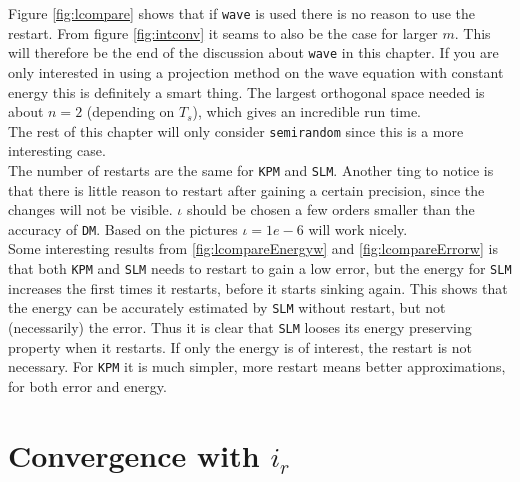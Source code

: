 Figure \ref{fig:lcompare} shows that if \texttt{wave} is used there is no reason to use the restart. From figure \ref{fig:intconv} it seams to also be the case for larger $m$. This will therefore be the end of the discussion about \texttt{wave} in this chapter. If you are only interested in using a projection method on the wave equation with constant energy this is definitely a smart thing. The largest orthogonal space needed is about $n=2$ (depending on $T_s$), which gives an incredible run time.\\
The rest of this chapter will only consider \texttt{semirandom} since this is a more interesting case. \\

The number of restarts are the same for \texttt{KPM} and \texttt{SLM}. Another ting to notice is that there is little reason to restart after gaining a certain precision, since the changes will not be visible. $\iota$ should be chosen a few orders smaller than the accuracy of \texttt{DM}. Based on the pictures $\iota = 1e-6$ will work nicely. \\

Some interesting results from \ref{fig:lcompareEnergyw} and \ref{fig:lcompareErrorw} is that both \texttt{KPM} and \texttt{SLM} needs to restart to gain a low error, but the energy for \texttt{SLM} increases the first times it restarts, before it starts sinking again. This shows that the energy can be accurately estimated by \texttt{SLM} without restart, but not (necessarily) the error.  Thus it is clear that \texttt{SLM} looses its energy preserving property when it restarts. If only the energy is of interest, the restart is not necessary. For \texttt{KPM} it is much simpler, more restart means better approximations, for both error and energy.\\

\section{Convergence with $i_r$} %

